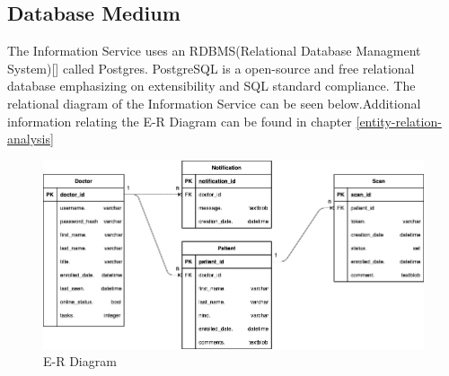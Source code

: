 		\subsection{Database Medium}
		The Information Service uses an RDBMS(Relational Database Managment System)[\cite{friedrichsen_ruffolo_monk_starks_pratt_last_1995}] called Postgres. PostgreSQL is a open-source and 
		free relational database emphasizing on extensibility and SQL standard compliance. The relational diagram of the Information Service
		can be seen below.Additional information relating the E-R Diagram can be found in chapter \ref{entity-relation-analysis} \pagebreak
		\begin{figure}[H]
			\iftrue
			\caption{E-R Diagram}
			\centering
			\includegraphics[angle=90,origin=c,scale=0.8]{figures/InformationServiceDatabaseDiagram}
			\fi
		\end{figure}\pagebreak
			
		